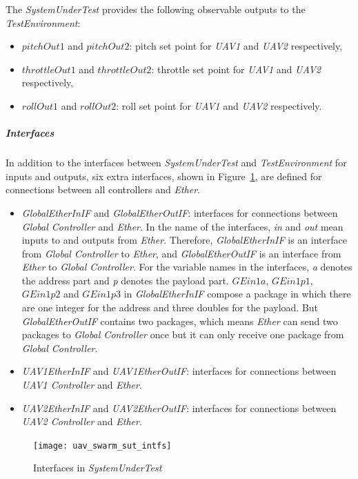 The \emph{SystemUnderTest} provides the following observable outputs to the \emph{TestEnvironment}:
\begin{itemize}
    \item $pitchOut1$ and $pitchOut2$: pitch set point for \emph{UAV1} and \emph{UAV2} respectively,
    \item $throttleOut1$ and $throttleOut2$: throttle set point for \emph{UAV1} and \emph{UAV2} respectively,
    \item $rollOut1$ and $rollOut2$: roll set point for \emph{UAV1} and \emph{UAV2} respectively.
\end{itemize}

\subparagraph{Interfaces}
In addition to the interfaces between \emph{SystemUnderTest} and \emph{TestEnvironment} for inputs and outputs, six extra interfaces, shown in Figure~\ref{fig:uav_swarm_sut_intfs}, are defined for connections between all controllers and \emph{Ether}.
\begin{itemize}
    \item \emph{GlobalEtherInIF} and \emph{GlobalEtherOutIF}: interfaces for connections between \emph{Global Controller} and \emph{Ether}. In the name of the interfaces, \emph{in} and \emph{out} mean inputs to and outputs from \emph{Ether}. Therefore, \emph{GlobalEtherInIF} is an interface from \emph{Global Controller} to \emph{Ether}, and \emph{GlobalEtherOutIF} is an interface from \emph{Ether} to \emph{Global Controller}. For the variable names in the interfaces, \emph{a} denotes the address part and \emph{p} denotes the payload part. $GEin1a$, $GEin1p1$, $GEin1p2$ and $GEin1p3$ in \emph{GlobalEtherInIF} compose a package in which there are one integer for the address and three doubles for the payload. But \emph{GlobalEtherOutIF} contains two packages, which means \emph{Ether} can send two packages to \emph{Global Controller} once but it can only receive one package from \emph{Global Controller}.
    \item \emph{UAV1EtherInIF} and \emph{UAV1EtherOutIF}: interfaces for connections between \emph{UAV1 Controller} and \emph{Ether}. 
    \item \emph{UAV2EtherInIF} and \emph{UAV2EtherOutIF}: interfaces for connections between \emph{UAV2 Controller} and \emph{Ether}. 
\end{itemize}

\begin{figure}[htb!]
    \centering
	\texttt{[image: uav\_swarm\_sut\_intfs]}
    \caption{Interfaces in \emph{SystemUnderTest}}
    \label{fig:uav_swarm_sut_intfs}
\end{figure}

